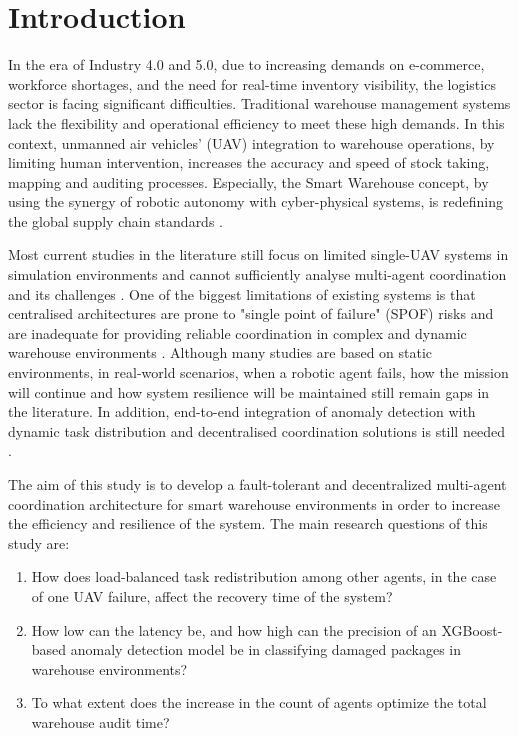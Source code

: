 \documentclass[conference]{IEEEtran}
\begin{document}
\section{Introduction}

In the era of Industry 4.0 and 5.0, due to increasing demands on e-commerce, workforce shortages, and the need for real-time inventory visibility, the logistics sector is facing significant difficulties\cite{zhang2025autonomous}. Traditional warehouse management systems lack the flexibility and operational efficiency to meet these high demands\cite{zhang2025autonomous}. In this context, unmanned air vehicles' (UAV) integration to warehouse operations, by limiting human intervention, increases the accuracy and speed of stock taking, mapping and auditing processes\cite{pore2026drone}. Especially, the Smart Warehouse concept, by using the synergy of robotic autonomy with cyber-physical systems, is redefining the global supply chain standards \cite{pore2026drone}.

Most current studies in the literature still focus on limited single-UAV systems in simulation environments and cannot sufficiently analyse multi-agent coordination and its challenges \cite{pore2026drone}. One of the biggest limitations of existing systems is that centralised architectures are prone to "single point of failure" (SPOF) risks and are inadequate for providing reliable coordination in complex and dynamic warehouse environments \cite{abro2024synergistic}. Although many studies are based on static environments, in real-world scenarios, when a robotic agent fails, how the mission will continue and how system resilience will be maintained still remain gaps in the literature\cite{abro2024synergistic}. In addition, end-to-end integration of anomaly detection with dynamic task distribution and decentralised coordination solutions is still needed \cite{fourie2025development}.

The aim of this study is to develop a fault-tolerant and decentralized multi-agent coordination architecture for smart warehouse environments in order to increase the efficiency and resilience of the system. The main research questions of this study are:

\begin{enumerate}

    \item How does load-balanced task redistribution among other agents, in the case of one UAV failure, affect the recovery time of the system?

    \item How low can the latency be, and how high can the precision of an XGBoost-based anomaly detection model be in classifying damaged packages in warehouse environments?

    \item To what extent does the increase in the count of agents optimize the total warehouse audit time?

\end{enumerate}
\end{document}
